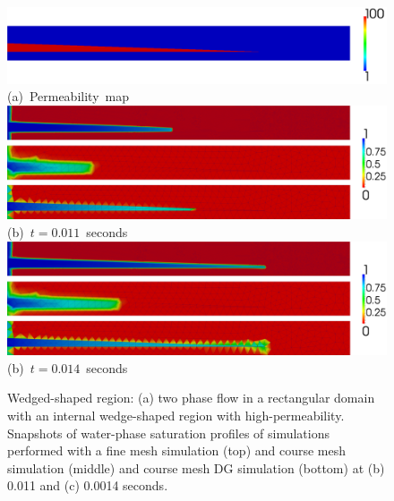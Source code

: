 \begin{figure}[h]
\vbox{
\hbox{
\hspace{-0.cm}\includegraphics[width=1.05\textwidth]{./diagrams/wedge_permeability}}
\vspace{-1.cm}\hbox{\hspace{4cm}(a) Permeability map}
\vspace{.5cm}
\hbox{
\hspace{-0.cm}\includegraphics[width=1.05\textwidth]{./diagrams/wedge_0011}}
\vspace{-0.cm}\hbox{\hspace{4cm}(b) $t= 0.011$ seconds }
\vspace{.5cm}
\hbox{
\hspace{-.cm}\includegraphics[width=1.05\textwidth]{./diagrams/wedge_0014}}
\vspace{-0.cm}\hbox{\hspace{4cm}(b) $t= 0.014$ seconds }
}
\caption{Wedged-shaped region: (a) two phase flow in a rectangular domain with an internal wedge-shaped region with high-permeability. Snapshots of water-phase saturation profiles of simulations performed with a fine mesh  simulation (top) 
and course mesh  simulation (middle)  and course mesh DG simulation (bottom) at (b) 0.011 and (c) 0.0014 seconds.\label{fig:wedge_permeability}}
\end{figure}


